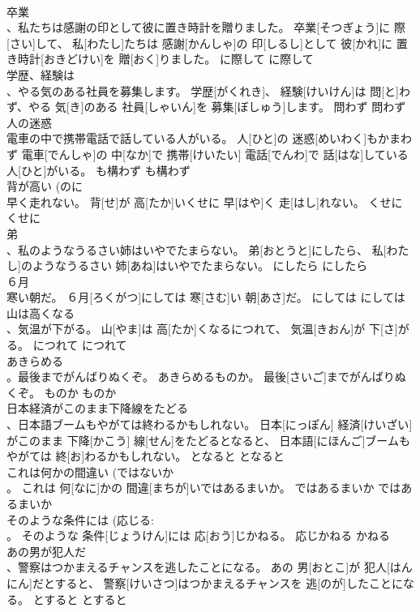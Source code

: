 \documentclass[8pt]{extreport}
\begin{document}
\begin{CJK}{UTF8}{min}
\\	卒業 
\\	、私たちは感謝の印として彼に置き時計を贈りました。	卒業[そつぎょう]に 際[さい]して、 私[わたし]たちは 感謝[かんしゃ]の 印[しるし]として 彼[かれ]に 置き時計[おきどけい]を 贈[おく]りました。	に際して	に際して	
\\	学歴、経験は 
\\	、やる気のある社員を募集します。	学歴[がくれき]、 経験[けいけん]は 問[と]わず、やる 気[き]のある 社員[しゃいん]を 募集[ぼしゅう]します。	問わず	問わず	
\\	人の迷惑 
\\	電車の中で携帯電話で話している人がいる。	人[ひと]の 迷惑[めいわく]もかまわず 電車[でんしゃ]の 中[なか]で 携帯[けいたい] 電話[でんわ]で 話[はな]している 人[ひと]がいる。	も構わず	も構わず	
\\	背が高い (のに 
\\	早く走れない。	背[せ]が 高[たか]いくせに 早[はや]く 走[はし]れない。	くせに	くせに	
\\	弟 
\\	、私のようなうるさい姉はいやでたまらない。	弟[おとうと]にしたら、 私[わたし]のようなうるさい 姉[あね]はいやでたまらない。	にしたら	にしたら	
\\	６月 
\\	寒い朝だ。	６月[ろくがつ]にしては 寒[さむ]い 朝[あさ]だ。	にしては	にしては	
\\	山は高くなる 
\\	、気温が下がる。	山[やま]は 高[たか]くなるにつれて、 気温[きおん]が 下[さ]がる。	につれて	につれて	
\\	あきらめる 
\\	。最後までがんばりぬくぞ。	あきらめるものか。 最後[さいご]までがんばりぬくぞ。	ものか	ものか	
\\	日本経済がこのまま下降線をたどる 
\\	、日本語ブームもやがては終わるかもしれない。	日本[にっぽん] 経済[けいざい]がこのまま 下降[かこう] 線[せん]をたどるとなると、 日本語[にほんご]ブームもやがては 終[お]わるかもしれない。	となると	となると	
\\	これは何かの間違い (ではないか 
\\	。	これは 何[なに]かの 間違[まちが]いではあるまいか。	ではあるまいか	ではあるまいか	
\\	そのような条件には (応じる: 
\\	。	そのような 条件[じょうけん]には 応[おう]じかねる。	応じかねる	かねる	
\\	あの男が犯人だ 
\\	、警察はつかまえるチャンスを逃したことになる。	あの 男[おとこ]が 犯人[はんにん]だとすると、 警察[けいさつ]はつかまえるチャンスを 逃[のが]したことになる。	とすると	とすると	

\end{CJK}
\end{document}
